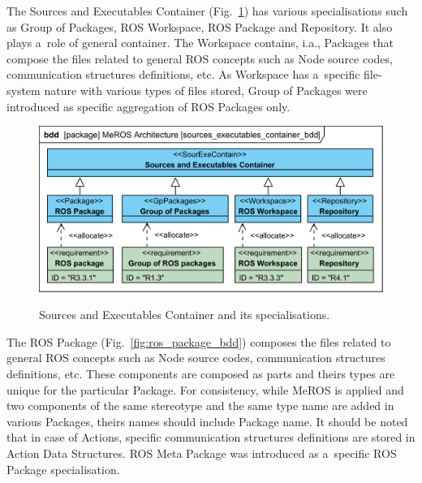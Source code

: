 \documentclass[11pt,oneside,a4paper]{report}
\begin{document}
	\pagebreak
	
	The Sources and Executables Container (Fig.~\ref{fig:sources_executables_container_bdd}) has various specialisations such as Group of Packages, ROS Workspace, ROS Package and Repository. It also plays a~role of general container.  
	The Workspace contains, i.a., Packages that compose the files related to general ROS concepts such as Node source codes, communication structures definitions, etc. As Workspace has a~specific file-system nature with various types of files stored, Group of Packages were introduced as specific aggregation of ROS Packages only.
	
	
	\begin{figure}[H]
		\centering
		\begin{center}
			{\includegraphics[scale=1.0]{diagrams/sources_executables_container_bdd.png}}
		\end{center}
		\caption{Sources and Executables Container and its specialisations.} 
		\label{fig:sources_executables_container_bdd}
	\end{figure}
	
	The ROS Package (Fig.~\ref{fig:ros_package_bdd}) composes the files related to general ROS concepts such as Node source codes, communication structures definitions, etc. These components are composed as parts and theirs types are unique for the particular Package. For consistency, while MeROS is applied and two components of the same stereotype and the same type name are added in various Packages, theirs names should include Package name.  It should be noted that in case of Actions, specific communication structures definitions are stored in Action Data Structures. ROS Meta Package was introduced as a~specific ROS Package specialisation.
	
\end{document}
